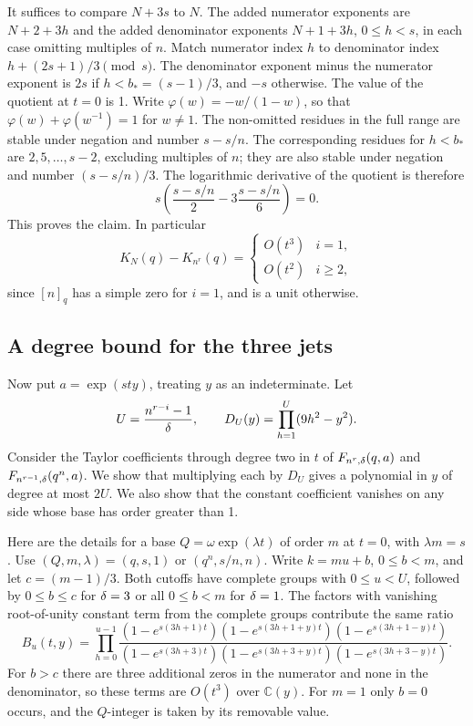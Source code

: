 \documentclass[11pt,a4paper]{article}
\begin{document}
It suffices to compare \(N+3s\) to \(N\).
The added numerator exponents are \(N+2+3h\) and the added denominator
exponents \(N+1+3h\), \(0\le h<s\), in each case omitting multiples of \(n\).
Match numerator index \(h\) to denominator index
\(h+(2s+1)/3\pmod s\). The denominator exponent minus the numerator
exponent is \(2s\) if \(h<b_*=(s-1)/3\), and \(-s\) otherwise.
The value of the quotient at \(t=0\) is 1. Write
\(\varphi(w)=-w/(1-w)\), so that
\(\varphi(w)+\varphi(w^{-1})=1\) for \(w\ne1\).
The non-omitted residues in the full range are stable under negation
and number \(s-s/n\). The corresponding residues for \(h<b_*\)
are \(2,5,\dots,s-2\), excluding multiples of \(n\); they are also
stable under negation and number \((s-s/n)/3\).
The logarithmic derivative of the quotient is therefore
\[
 s\left(\frac{s-s/n}{2}-3\frac{s-s/n}{6}\right)=0.
\]
This proves the claim. In particular
\begin{equation}\label{R18T:eq:K}
 K_N(q)-K_{n^r}(q)=
 \begin{cases}O(t^3)&i=1,\\ O(t^2)&i\ge2,\end{cases}
\end{equation}
since \([n]_q\) has a simple zero for \(i=1\), and is a unit otherwise.

\subsection{A degree bound for the three jets}
Now put \(a=\exp(sty)\), treating \(y\) as an indeterminate.
Let
\[
 U=\frac{n^{r-i}-1}{\delta},\qquad
 D_U(y)=\prod_{h=1}^{U}(9h^2-y^2).
\]
Consider the Taylor coefficients through degree two in \(t\)
of \(F_{n^r,\delta}(q,a)\) and \(F_{n^{r-1},\delta}(q^n,a)\).
We show that multiplying each by \(D_U\) gives a polynomial in
\(y\) of degree at most \(2U\). We also show that the constant
coefficient vanishes on any side whose base has order greater than 1.

Here are the details for a base \(Q=\omega\exp(\lambda t)\) of order
\(m\) at \(t=0\), with \(\lambda m=s\). Use
\((Q,m,\lambda)=(q,s,1)\) or \((q^n,s/n,n)\).
Write \(k=mu+b\), \(0\le b<m\), and let \(c=(m-1)/3\).
Both cutoffs have complete groups with \(0\le u<U\), followed by
\(0\le b\le c\) for \(\delta=3\) or all \(0\le b<m\) for \(\delta=1\).
The factors with vanishing root-of-unity constant term from the complete
groups contribute the same ratio
\begin{equation}\label{R18T:eq:B}
 B_u(t,y)=\prod_{h=0}^{u-1}
 \frac{(1-e^{s(3h+1)t})(1-e^{s(3h+1+y)t})(1-e^{s(3h+1-y)t})}
 {(1-e^{s(3h+3)t})(1-e^{s(3h+3+y)t})(1-e^{s(3h+3-y)t})}.
\end{equation}
For \(b>c\) there are three additional zeros in the numerator and
none in the denominator, so these terms are \(O(t^3)\) over
\(\mathbb C(y)\). For \(m=1\) only \(b=0\) occurs, and the
\(Q\)-integer is taken by its removable value.
\end{document}
